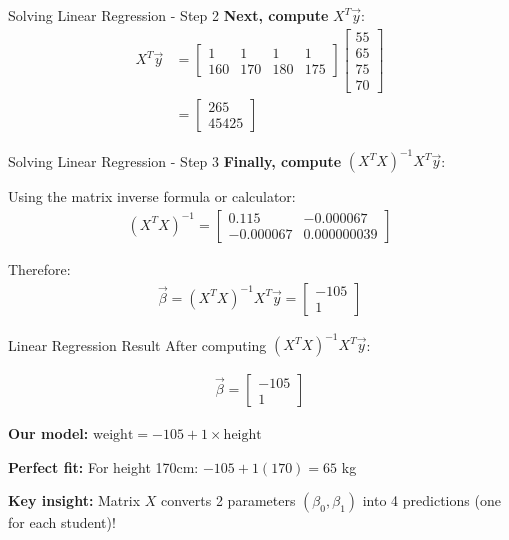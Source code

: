 \documentclass[aspectratio=169]{beamer}
\begin{document}
\begin{frame}{Solving Linear Regression - Step 2}
\textbf{Next, compute } $X^T \vec{y}$:
\begin{align}
X^T \vec{y} &= \begin{bmatrix} 1 & 1 & 1 & 1 \\ 160 & 170 & 180 & 175 \end{bmatrix} \begin{bmatrix} 55 \\ 65 \\ 75 \\ 70 \end{bmatrix} \\
&= \begin{bmatrix} 265 \\ 45425 \end{bmatrix}
\end{align}
\end{frame}

\begin{frame}{Solving Linear Regression - Step 3}
\textbf{Finally, compute } $(X^T X)^{-1} X^T \vec{y}$:

\vspace{1em}
Using the matrix inverse formula or calculator:
\begin{align}
(X^T X)^{-1} = \begin{bmatrix} 0.115 & -0.000067 \\ -0.000067 & 0.000000039 \end{bmatrix}
\end{align}

\vspace{1em}
Therefore:
\begin{align}
\vec{\beta} = (X^T X)^{-1} X^T \vec{y} = \begin{bmatrix} -105 \\ 1 \end{bmatrix}
\end{align}
\end{frame}

\begin{frame}{Linear Regression Result}
After computing $(X^T X)^{-1} X^T \vec{y}$:

\begin{align}
\vec{\beta} = \begin{bmatrix} -105 \\ 1 \end{bmatrix}
\end{align}

\vspace{1em}
\textbf{Our model:} $\text{weight} = -105 + 1 \times \text{height}$

\vspace{0.5em}
\textbf{Perfect fit:} For height 170cm: $-105 + 1(170) = 65$ kg

\vspace{1em}
\textbf{Key insight:} Matrix $X$ converts 2 parameters $(\beta_0, \beta_1)$ into 4 predictions (one for each student)!
\end{frame}
\end{document}
